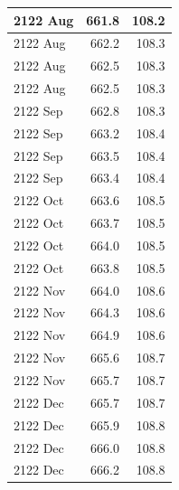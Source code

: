\documentclass[
]{article}
\begin{document}
\begin{table}[H]
\begin{tabular}[t]{l|r|r}
\hline
2122 Aug & 661.8 & 108.2\\
\hline
2122 Aug & 662.2 & 108.3\\
\hline
2122 Aug & 662.5 & 108.3\\
\hline
2122 Aug & 662.5 & 108.3\\
\hline
2122 Sep & 662.8 & 108.3\\
\hline
2122 Sep & 663.2 & 108.4\\
\hline
2122 Sep & 663.5 & 108.4\\
\hline
2122 Sep & 663.4 & 108.4\\
\hline
2122 Oct & 663.6 & 108.5\\
\hline
2122 Oct & 663.7 & 108.5\\
\hline
2122 Oct & 664.0 & 108.5\\
\hline
2122 Oct & 663.8 & 108.5\\
\hline
2122 Nov & 664.0 & 108.6\\
\hline
2122 Nov & 664.3 & 108.6\\
\hline
2122 Nov & 664.9 & 108.6\\
\hline
2122 Nov & 665.6 & 108.7\\
\hline
2122 Nov & 665.7 & 108.7\\
\hline
2122 Dec & 665.7 & 108.7\\
\hline
2122 Dec & 665.9 & 108.8\\
\hline
2122 Dec & 666.0 & 108.8\\
\hline
2122 Dec & 666.2 & 108.8\\
\hline
\end{tabular}
\end{table}
\end{document}

